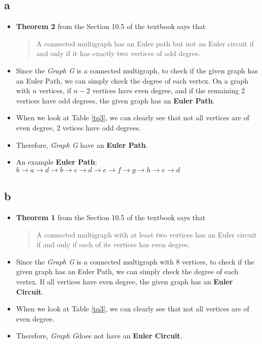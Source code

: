 \documentclass[11pt]{article}
\begin{document}
\subsection*{a}
\begin{itemize}
    \item  \textbf{Theorem 2} from the Section 10.5 of the textbook says that 
    \begin{quote}
        A connected multigraph has an Euler path but not an Euler circuit if and only if it has exactly two vertices of odd degree.
    \end{quote}
    \item Since the \textit{Graph G} is a connected multigraph, to check if the given graph has an Euler Path, we can simply check the degree of each vertex. On a graph with $n$ vertices, if $n-2$ vertices have even degree, and if the remaining 2 vertices have odd degrees, the given graph has an \textbf{Euler Path}. 
    \item When we look at Table \ref{tq3}, we can clearly see that not all vertices are of even degree, 2 vetices have odd degrees. 
    \item Therefore, \textit{Graph G} have an \textbf{Euler Path}.
    \item An example \textbf{Euler Path}: $ b \rightarrow a \rightarrow d \rightarrow b \rightarrow c \rightarrow d \rightarrow e \rightarrow f \rightarrow g \rightarrow h \rightarrow e \rightarrow d$
\end{itemize}

\subsection*{b}
\begin{itemize}
    \item  \textbf{Theorem 1} from the Section 10.5 of the textbook says that 
    \begin{quote}
        A connected multigraph with at least two vertices has an Euler circuit if and only if each of its vertices has even degree.
    \end{quote}
    \item Since the \textit{Graph G} is a connected multigraph with 8 vertices, to check if the given graph has an Euler Path, we can simply check the degree of each vertex. If all vertices have even degree, the given graph has an \textbf{Euler Circuit}. 
    \item When we look at Table \ref{tq3}, we can clearly see that not all vertices are of even degree. 
    \item Therefore, \textit{Graph G}does not have an \textbf{Euler Circuit}. 
    
\end{itemize}
\end{document}
